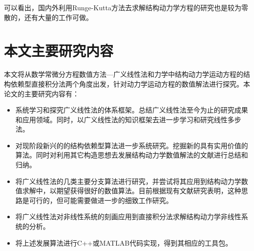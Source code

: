 可以看出，国内外利用Runge-Kutta方法去求解结构动力学方程的研究也是较为零散的，还有大量的工作可做。
\section{本文主要研究内容}
本文将从数学常微分方程数值方法—广义线性法和力学中结构动力学运动方程的结构依赖型直接积分法两个角度出发，针对动力学运动方程的数值解法进行探究。本论文的主要研究内容有：
\begin{itemize}
\item 系统学习和探究广义线性法的体系框架。总结广义线性法至今为止的研究成果和应用领域。同时，以广义线性法的知识框架去进一步学习和研究线性多步法。
\item 对现阶段新兴的的结构依赖型算法进一步系统研究。挖掘新的具有实用价值的算法。同时对利用其它构造思想去发展结构动力学数值解法的文献进行总结和归纳。
\item 将广义线性法的几类主要分支算法进行研究，并尝试将其应用到结构动力学数值求解中，以期望获得很好的数值算法。目前根据现有文献研究表明，这种思路是可行的，但可能需要做进一步的细致工作研究。
\item 将广义线性法对非线性系统的刻画应用到直接积分法求解结构动力学非线性系统的分析。
\item 将上述发展算法进行C++或MATLAB代码实现，得到其相应的工具包。
\end{itemize}
